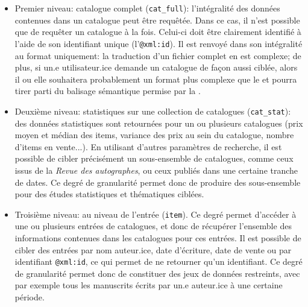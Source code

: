 \begin{itemize}
	\item Premier niveau: catalogue complet (\texttt{cat\_full}): l'intégralité des données contenues dans un catalogue peut être requêtée. Dans ce cas, il n'est possible que de requêter un catalogue à la fois. Celui-ci doit être clairement identifié à l'aide de son identifiant unique (l'\texttt{@xml:id}). Il est renvoyé dans son intégralité au format \xml{} uniquement: la traduction d'un fichier \xmltei{} complet en \json{} est complexe; de plus, si un.e utilisateur.ice demande un catalogue de façon aussi ciblée, alors il ou elle souhaitera probablement un format plus complexe que le \json{} et pourra tirer parti du balisage sémantique permise par la \tei{}.
	\item Deuxième niveau: statistiques sur une collection de catalogues (\texttt{cat\_stat}): des données statistiques sont retournées pour un ou plusieurs catalogues (prix moyen et médian des items, variance des prix au sein du catalogue, nombre d'items en vente...). En utilisant d'autres paramètres de recherche, il est possible de cibler précisément un sous-ensemble de catalogues, comme ceux issus de la \textit{Revue des autographes}, ou ceux publiés dans une certaine tranche de dates. Ce degré de granularité permet donc de produire des sous-ensemble pour des études statistiques et thématiques ciblées.
	\item Troisième niveau: au niveau de l'entrée (\texttt{item}). Ce degré permet d'accéder à une ou plusieurs entrées de catalogues, et donc de récupérer l'ensemble des informations contenues dans les catalogues pour ces entrées. Il est possible de cibler des entrées par nom auteur.ice, date d'écriture, date de vente ou par identifiant \texttt{@xml:id}, ce qui permet de ne retourner qu'un identifiant. Ce degré de granularité permet donc de constituer des jeux de données restreints, avec par exemple tous les manuscrits écrits par un.e auteur.ice à une certaine période.
\end{itemize}

